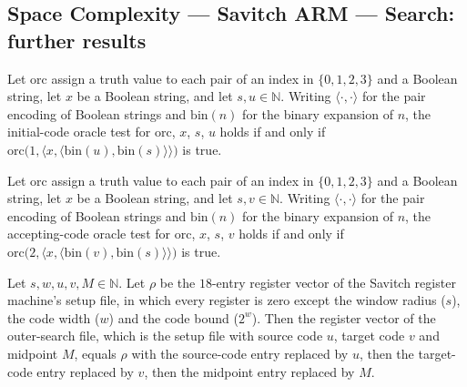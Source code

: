 \subsection*{Space Complexity --- Savitch ARM --- Search: further results}

\begin{theorem}
\label{Complexity.LogProg.SavitchARM.initO_iff_orc}
\leanok
{}
Let $\mathrm{orc}$ assign a truth value to each pair of an index in $\{0,1,2,3\}$ and a
Boolean string, let $x$ be a Boolean string, and let $s,u\in\mathbb{N}$. Writing
$\langle\cdot,\cdot\rangle$ for the pair encoding of Boolean strings and
$\mathrm{bin}(n)$ for the binary expansion of $n$, the initial-code oracle test for
$\mathrm{orc}$, $x$, $s$, $u$ holds if and only if
$\mathrm{orc}\bigl(1,\langle x,\langle\mathrm{bin}(u),\mathrm{bin}(s)\rangle\rangle\bigr)$
is true.
\end{theorem}

\begin{theorem}
\label{Complexity.LogProg.SavitchARM.accO_iff_orc}
\leanok
{}
Let $\mathrm{orc}$ assign a truth value to each pair of an index in $\{0,1,2,3\}$ and a
Boolean string, let $x$ be a Boolean string, and let $s,v\in\mathbb{N}$. Writing
$\langle\cdot,\cdot\rangle$ for the pair encoding of Boolean strings and
$\mathrm{bin}(n)$ for the binary expansion of $n$, the accepting-code oracle test for
$\mathrm{orc}$, $x$, $s$, $v$ holds if and only if
$\mathrm{orc}\bigl(2,\langle x,\langle\mathrm{bin}(v),\mathrm{bin}(s)\rangle\rangle\bigr)$
is true.
\end{theorem}

\begin{theorem}
\label{Complexity.LogProg.SavitchARM.outerSt_toV}
\leanok
{}
Let $s,w,u,v,M\in\mathbb{N}$. Let $\rho$ be the $18$-entry register vector of the
Savitch register machine's setup file, in which every register is zero except the
window radius ($s$), the code width ($w$) and the code bound ($2^w$). Then the register
vector of the outer-search file, which is the setup file with source code $u$, target
code $v$ and midpoint $M$, equals $\rho$ with the source-code entry replaced by $u$, then
the target-code entry replaced by $v$, then the midpoint entry replaced by $M$.
\end{theorem}
